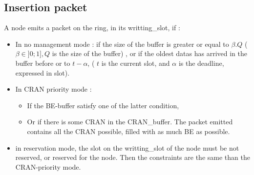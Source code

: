 \documentclass[a4paper,10pt]{article}
\begin{document}
	\subsection{Insertion packet}
	A node emits a packet on the ring, in its writting\_slot, if :
\begin{itemize}
\item In no management mode :  if the size of the buffer is greater or equal to $\beta .Q $ ($\beta \in ]0;1] , Q$ is the size of the buffer) , or if the oldest datas has arrived in the buffer before or to $t-\alpha$, ( $t$ is the current slot, and $\alpha$ is the deadline, expressed in slot).
\item In CRAN priority mode : 
	\begin{itemize}
	\item If the BE-buffer satisfy one of the latter condition,
	\item Or if there is some CRAN in the CRAN\_buffer. The packet emitted contains all the CRAN possible, filled with as much BE as possible. 
	\end{itemize}
\item in reservation mode, the slot on the writting\_slot of the node must be not reserved, or reserved for the node. Then the constraints are the same than the CRAN-priority mode.
\end{itemize} 	
\end{document}
